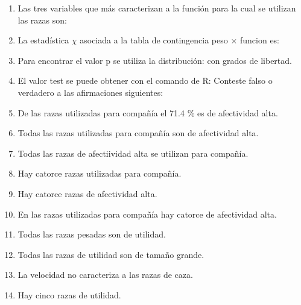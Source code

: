 \documentclass[letterpaper, 12pt]{article}
\begin{document}
\newpage 
\begin{enumerate}
\item Las tres variables que más caracterizan a la función para la cual se
utilizan las razas son: 

\item La estadística $\chi$ asociada a la tabla de contingencia peso × funcion
es:
\item Para encontrar el valor p se utiliza la distribución: con grados de libertad.
\item El valor test se puede obtener con el comando de R:
Conteste falso o verdadero a las afirmaciones siguientes:
\item De las razas utilizadas para compañía el 71.4 \% es de afectividad
alta.
\item Todas las razas utilizadas para compañía son de afectividad alta.
\item Todas las razas de afectiividad alta se utilizan para compañía.
\item Hay catorce razas utilizadas para compañía.
\item Hay catorce razas de afectividad alta.
\item En las razas utilizadas para compañía hay catorce de afectividad alta.
\item Todas las razas pesadas son de utilidad.
\item Todas las razas de utilidad son de tamaño grande.
\item La velocidad no caracteriza a las razas de caza.
\item Hay cinco razas de utilidad.
\end{enumerate}
\end{document}
